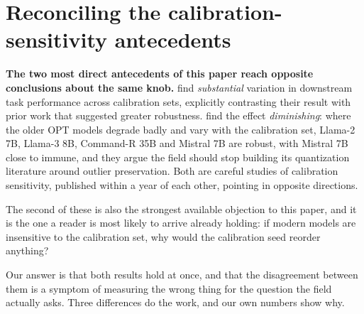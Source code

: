 %
%

\section{Reconciling the calibration-sensitivity antecedents}
\label{app:reconcile}

\textbf{The two most direct antecedents of this paper reach opposite
conclusions about the same knob.} \citet{williamsaletras2024} find
\emph{substantial} variation in downstream task performance across calibration
sets, explicitly contrasting their result with prior work that suggested greater
robustness. \citet{paglieri2024outliers} find the effect \emph{diminishing}:
where the older OPT models degrade badly and vary with the calibration set,
Llama-2 7B, Llama-3 8B, Command-R 35B and Mistral 7B are robust, with Mistral 7B
close to immune, and they argue the field should stop building its quantization
literature around outlier preservation. Both are careful studies of calibration
sensitivity, published within a year of each other, pointing in opposite
directions.

The second of these is also the strongest available objection to this paper,
and it is the one a reader is most likely to arrive already holding: if modern
models are insensitive to the calibration set, why would the calibration seed
reorder anything?

Our answer is that both results hold at once, and that the disagreement between
them is a symptom of measuring the wrong thing for the question the field
actually asks. Three differences do the work, and our own numbers show why.

